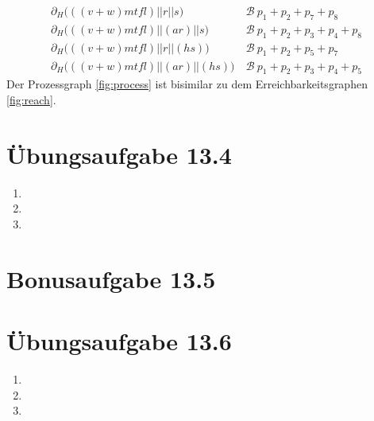 \documentclass[a4paper]{scrartcl}
\begin{document}
\begin{enumerate}
\begin{equation}
\begin{split}
                \partial_H \Big( ((v + w)mtfl) || r || s \Big) \ &\mathcal{B}\  p_1 + p_2 + p_7 + p_8 \\
                \partial_H \Big( ((v + w)mtfl) || (ar) || s \Big) \ &\mathcal{B}\  p_1 + p_2 + p_3 + p_4 + p_8 \\
                \partial_H \Big( ((v + w)mtfl) || r || (hs) \Big) \ &\mathcal{B}\  p_1 + p_2 + p_5 + p_7 \\
                \partial_H \Big( ((v + w)mtfl) || (ar) || (hs) \Big) \ &\mathcal{B}\  p_1 + p_2 + p_3 + p_4 + p_5
            \end{split}
        \end{equation}
        Der Prozessgraph \ref{fig:process} ist bisimilar zu dem
        Erreichbarkeitsgraphen \ref{fig:reach}.

\end{enumerate}

\section*{Übungsaufgabe 13.4} 

\begin{enumerate}
    \item

    \item

    \item

\end{enumerate}

\section*{Bonusaufgabe 13.5} 

\section*{Übungsaufgabe 13.6} 

\begin{enumerate}
    \item

    \item

    \item

\end{enumerate}
\end{document}
